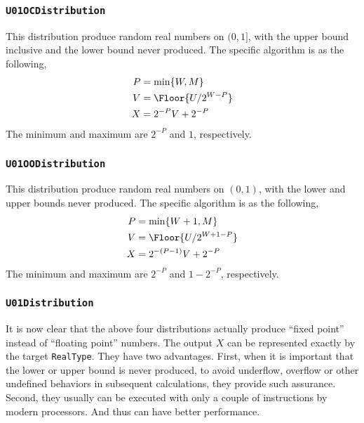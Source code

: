 \subsubsection{\texttt{U01OCDistribution}}

This distribution produce random real numbers on $(0, 1]$, with the upper bound
inclusive and the lower bound never produced. The specific algorithm is as the
following,
\begin{align*}
  P &= \min\{W, M\} \\
  V &= \Floor{U / 2^{W - P}} \\
  X &= 2^{-P} V + 2^{-P}
\end{align*}
The minimum and maximum are $2^{-P}$ and $1$, respectively.

\subsubsection{\texttt{U01OODistribution}}

This distribution produce random real numbers on $(0, 1)$, with the lower and
upper bounds never produced. The specific algorithm is as the following,
\begin{align*}
  P &= \min\{W + 1, M\} \\
  V &= \Floor{U / 2^{W + 1 - P}} \\
  X &= 2^{-(P - 1)} V + 2^{-P}
\end{align*}
The minimum and maximum are $2^{-P}$ and $1 - 2^{-P}$, respectively.

\subsubsection{\texttt{U01Distribution}}

It is now clear that the above four distributions actually produce ``fixed
point'' instead of ``floating point'' numbers. The output $X$ can be
represented exactly by the target \verb|RealType|. They have two advantages.
First, when it is important that the lower or upper bound is never produced, to
avoid underflow, overflow or other undefined behaviors in subsequent
calculations, they provide such assurance. Second, they usually can be executed
with only a couple of instructions by modern processors. And thus can have
better performance.

